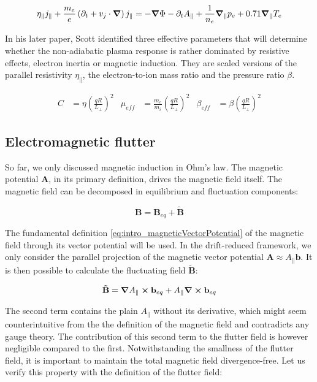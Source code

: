 \begin{equation}
	\label{eq:electromagneticElectronInertiaOhmsLaw}
	\eta_\parallel j_\parallel + \frac{m_e}{e}\left(\partial_t + v_j\cdot\grad\right)j_\parallel = -\grad\Phi - \partial_t A_\parallel  + \frac{1}{n_e}\grad_\parallel p_e + 0.71\grad_\parallel T_e
\end{equation}

In his later paper\cite{scott2003}, Scott identified three effective parameters that will determine whether the non-adiabatic plasma response is rather dominated by resistive effects, electron inertia or magnetic induction. They are scaled versions of the parallel resistivity $\eta_\parallel$, the electron-to-ion mass ratio and the pressure ratio $\beta$. 

\begin{align}
	C &= \eta\left(\frac{qR}{L_\perp}\right)^2	&
	\mu_{eff} &= \frac{m_e}{m_i}\left(\frac{qR}{L_\perp}\right)^2 &
	\beta_{eff} &= \beta\left(\frac{qR}{L_\perp}\right)^2
\end{align} 




\subsection{Electromagnetic flutter}

So far, we only discussed magnetic induction in Ohm's law. The magnetic potential $\textbf{A}$, in its primary definition, drives the magnetic field itself. The magnetic field can be decomposed in equilibrium and fluctuation components:

\begin{equation}
	\mathbf{B} = \mathbf{B}_{eq} + \mathbf{\tilde{B}}
\end{equation}

The fundamental definition \ref{eq:intro_magneticVectorPotential} of the magnetic field through its vector potential will be used. In the drift-reduced framework, we only consider the parallel projection of the magnetic vector potential $\mathbf{A} \approx A_\parallel\mathbf{b}$. It is then possible to calculate the fluctuating field $\mathbf{\tilde{B}}$:

\begin{equation}
	\mathbf{\tilde{B}} = \grad A_\parallel\cross\mathbf{b}_{eq} + A_\parallel \grad\cross \mathbf{b}_{eq}
\end{equation}

The second term contains the plain $A_\parallel$ without its derivative, which might seem counterintuitive from the the definition of the magnetic field and contradicts any gauge theory. The contribution of this second term to the flutter field is however negligible compared to the first. Notwithstanding the smallness of the flutter field, it is important to maintain the total magnetic field divergence-free. Let us verify this property with the definition of the flutter field:

